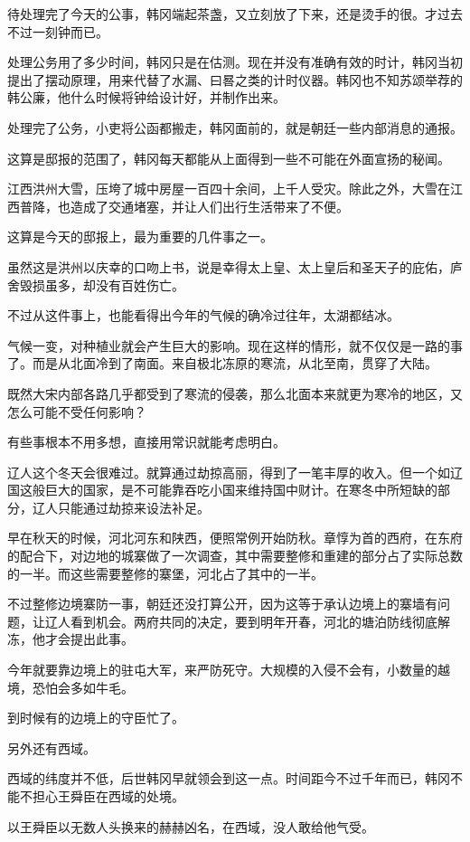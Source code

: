 待处理完了今天的公事，韩冈端起茶盏，又立刻放了下来，还是烫手的很。才过去不过一刻钟而已。

处理公务用了多少时间，韩冈只是在估测。现在并没有准确有效的时计，韩冈当初提出了摆动原理，用来代替了水漏、曰晷之类的计时仪器。韩冈也不知苏颂举荐的韩公廉，他什么时候将钟给设计好，并制作出来。

处理完了公务，小吏将公函都搬走，韩冈面前的，就是朝廷一些内部消息的通报。

这算是邸报的范围了，韩冈每天都能从上面得到一些不可能在外面宣扬的秘闻。

江西洪州大雪，压垮了城中房屋一百四十余间，上千人受灾。除此之外，大雪在江西普降，也造成了交通堵塞，并让人们出行生活带来了不便。

这算是今天的邸报上，最为重要的几件事之一。

虽然这是洪州以庆幸的口吻上书，说是幸得太上皇、太上皇后和圣天子的庇佑，庐舍毁损虽多，却没有百姓伤亡。

不过从这件事上，也能看得出今年的气候的确冷过往年，太湖都结冰。

气候一变，对种植业就会产生巨大的影响。现在这样的情形，就不仅仅是一路的事了。而是从北面冷到了南面。来自极北冻原的寒流，从北至南，贯穿了大陆。

既然大宋内部各路几乎都受到了寒流的侵袭，那么北面本来就更为寒冷的地区，又怎么可能不受任何影响？

有些事根本不用多想，直接用常识就能考虑明白。

辽人这个冬天会很难过。就算通过劫掠高丽，得到了一笔丰厚的收入。但一个如辽国这般巨大的国家，是不可能靠吞吃小国来维持国中财计。在寒冬中所短缺的部分，辽人只能通过劫掠来设法补足。

早在秋天的时候，河北河东和陕西，便照常例开始防秋。章惇为首的西府，在东府的配合下，对边地的城寨做了一次调查，其中需要整修和重建的部分占了实际总数的一半。而这些需要整修的寨堡，河北占了其中的一半。

不过整修边境寨防一事，朝廷还没打算公开，因为这等于承认边境上的寨墙有问题，让辽人看到机会。两府共同的决定，要到明年开春，河北的塘泊防线彻底解冻，他才会提出此事。

今年就要靠边境上的驻屯大军，来严防死守。大规模的入侵不会有，小数量的越境，恐怕会多如牛毛。

到时候有的边境上的守臣忙了。

另外还有西域。

西域的纬度并不低，后世韩冈早就领会到这一点。时间距今不过千年而已，韩冈不能不担心王舜臣在西域的处境。

以王舜臣以无数人头换来的赫赫凶名，在西域，没人敢给他气受。

